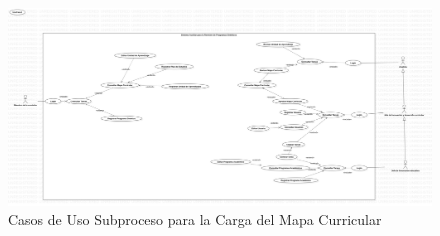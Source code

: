 \begin{figure}[htbp]
	\begin{center}
		\includegraphics[width=.95\textwidth]{C2-DR/SP4/Image/CasosDeUso}
		\caption{Casos de Uso Subproceso para la  Carga del Mapa Curricular}
		\label{DCU-4}
	\end{center}
\end{figure}

